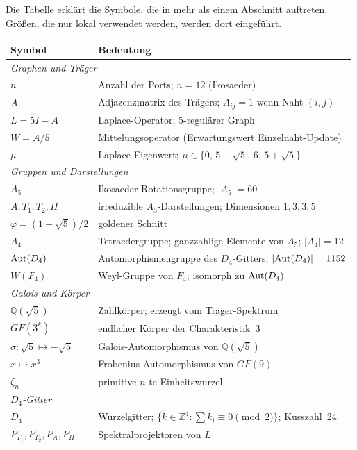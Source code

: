 Die Tabelle erklärt die Symbole, die in mehr als einem Abschnitt auftreten.
Größen, die nur lokal verwendet werden, werden dort eingeführt.

\medskip
\begin{tabular}{@{}lp{11cm}@{}}
\toprule
\textbf{Symbol} & \textbf{Bedeutung} \\
\midrule
\multicolumn{2}{l}{\textit{Graphen und Träger}} \\
$n$ & Anzahl der Ports; $n=12$ (Ikosaeder) \\
$A$ & Adjazenzmatrix des Trägers; $A_{ij}=1$ wenn Naht $(i,j)$ \\
$L=5I-A$ & Laplace-Operator; 5-regulärer Graph \\
$W=A/5$ & Mittelungsoperator (Erwartungswert Einzelnaht-Update) \\
$\mu$ & Laplace-Eigenwert; $\mu\in\{0,\,5{-}\sqrt5,\,6,\,5{+}\sqrt5\}$ \\
\midrule
\multicolumn{2}{l}{\textit{Gruppen und Darstellungen}} \\
$A_5$ & Ikosaeder-Rotationsgruppe; $|A_5|=60$ \\
$A,T_1,T_2,H$ & irreduzible $A_5$-Darstellungen; Dimensionen $1,3,3,5$ \\
$\varphi=(1{+}\sqrt5)/2$ & goldener Schnitt \\
$A_4$ & Tetraedergruppe; ganzzahlige Elemente von $A_5$; $|A_4|=12$ \\
${\rm Aut}(D_4)$ & Automorphismengruppe des $D_4$-Gitters; $|{\rm Aut}(D_4)|=1152$ \\
$W(F_4)$ & Weyl-Gruppe von $F_4$; isomorph zu ${\rm Aut}(D_4)$ \\
\midrule
\multicolumn{2}{l}{\textit{Galois und Körper}} \\
$\mathbb{Q}(\sqrt5)$ & Zahlkörper; erzeugt vom Träger-Spektrum \\
$GF(3^k)$ & endlicher Körper der Charakteristik~3 \\
$\sigma:\sqrt5\mapsto-\sqrt5$ & Galois-Automorphismus von $\mathbb{Q}(\sqrt5)$ \\
$x\mapsto x^3$ & Frobenius-Automorphismus von $GF(9)$ \\
$\zeta_n$ & primitive $n$-te Einheitswurzel \\
\midrule
\multicolumn{2}{l}{\textit{$D_4$-Gitter}} \\
$D_4$ & Wurzelgitter; $\{k\in\mathbb{Z}^4:\sum k_i\equiv0\pmod2\}$; Kusszahl~24 \\
$P_{T_1},P_{T_2},P_A,P_H$ & Spektralprojektoren von $L$ \\
\bottomrule
\end{tabular}


